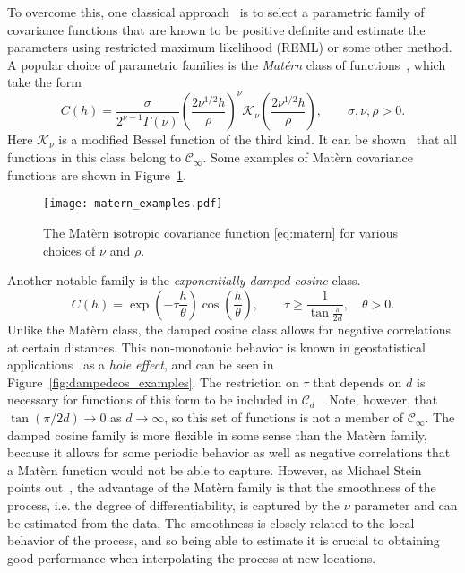 To overcome this, one classical approach~\cite{gelfand2010handbook} is to select a parametric family of covariance functions that are known to be positive definite and estimate the parameters using restricted maximum likelihood (REML) or some other method. A popular choice of parametric families is the \emph{Mat\'{e}rn} class of functions~\cite{handcock1994approach}, which take the form
\begin{equation} \label{eq:matern}
C(h) = \frac{\sigma}{2^{\nu - 1}\Gamma(\nu)} \left( \frac{2\nu^{1/2}h}{\rho} \right)^{\nu} \mathcal{K}_{\nu} \left( \frac{2\nu^{1/2}h}{\rho} \right), \qquad \sigma, \nu, \rho > 0.
\end{equation}
Here $\mathcal{K}_\nu$ is a modified Bessel function of the third kind. It can be shown~\cite{Stein1999} that all functions in this class belong to $\mathcal{C}_\infty$. Some examples of Mat\`ern covariance functions are shown in Figure~\ref{fig:matern_examples}.


\begin{figure}[!htb]
	\centering
	\texttt{[image: matern\_examples.pdf]}
	\caption{\small The Mat\`ern isotropic covariance function \eqref{eq:matern} for various choices of $\nu$ and $\rho$.}
	\label{fig:matern_examples}
\end{figure}


Another notable family is the \emph{exponentially damped cosine} class. 
\begin{equation} \label{eq:dampedcos}
	C(h) = \exp \left( -\tau \frac{h}{\theta} \right) \cos \left( \frac{h}{\theta} \right), \qquad \tau \geq \frac{1}{\tan \frac{\pi}{2d}}, \quad \theta > 0.
\end{equation}
Unlike the Mat\`ern class, the damped cosine class allows for negative correlations at certain distances. This non-monotonic behavior is known in geostatistical applications~\cite{Ye2015} as a \emph{hole effect}, and can be seen in Figure~\ref{fig:dampedcos_examples}. The restriction on $\tau$ that depends on $d$ is necessary for functions of this form to be included in $\mathcal{C}_d$~\cite{gelfand2010handbook}. Note, however, that $\tan(\pi/2d) \to 0$ as $d \to \infty$, so this set of functions is not a member of $\mathcal{C}_\infty$. The damped cosine family is more flexible in some sense than the Mat\`ern family, because it allows for some periodic behavior as well as negative correlations that a Mat\`ern function would not be able to capture. However, as Michael Stein points out~\cite{Stein1999}, the advantage of the Mat\`ern family is that the smoothness of the process, i.e. the degree of differentiability, is captured by the $\nu$ parameter and can be estimated from the data. The smoothness is closely related to the local behavior of the process, and so being able to estimate it is crucial to obtaining good performance when interpolating the process at new locations.

